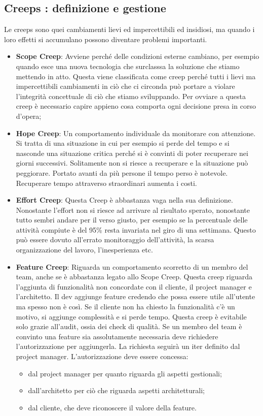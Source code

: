 \subsection{Creeps : definizione e gestione}
Le creeps sono quei cambiamenti lievi ed impercettibili ed insidiosi, ma quando i loro effetti si accumulano possono diventare problemi importanti.
\begin{itemize}
	\item \textbf{Scope Creep}: Avviene perché delle condizioni esterne cambiano, per esempio quando esce una nuova tecnologia che surclasssa la soluzione che stiamo mettendo in atto. Questa viene classificata come creep perché tutti i lievi ma impercettibili cambiamenti in ciò che ci circonda può portare a violare l'integrità concettuale di ciò che stiamo sviluppando. Per ovviare a questa creep è necessario capire appieno cosa comporta ogni decisione presa in corso d'opera;
	\item \textbf{Hope Creep}: Un comportamento individuale da monitorare con attenzione. Si tratta di una situazione in cui per esempio si perde del tempo e si nasconde una situazione critica perché si è convinti di poter recuperare nei giorni successivi. Solitamente non si riesce a recuperare e la situazione può peggiorare. Portato avanti da più persone il tempo perso è notevole. Recuperare tempo attraverso straordinari aumenta i costi.
	\item \textbf{Effort Creep}: Questa Creep è abbastanza vaga nella sua definizione. Nonostante l'effort non si riesce ad arrivare al risultato sperato, nonostante tutto sembri andare per il verso giusto, per esempio se la percentuale delle attività compiute è del 95\% resta invariata nel giro di una settimana. Questo può essere dovuto all'errato monitoraggio dell'attività, la scarsa organizzazione del lavoro, l'inesperienza etc.
	\item \textbf{Feature Creep}: Riguarda un comportamento scorretto di un membro del team, anche se è abbastanza legato allo Scope Creep. Questa creep riguarda l'aggiunta di funzionalità non concordate con il cliente, il project manager e l'architetto. Il dev aggiunge feature credendo che possa essere utile all'utente ma spesso non è così. Se il cliente non ha chiesto la funzionalità c'è un motivo, si aggiunge complessità e si perde tempo. Questa creep è evitabile solo grazie all'audit, ossia dei check di qualità.\newline
	Se un membro del team è convinto una feature sia assolutamente necessaria deve richiedere l'autorizzazione per aggiungerla. La richiesta seguirà un iter definito dal project manager. L'autorizzazione deve essere concessa:
	\begin{itemize}
		\item dal project manager per quanto riguarda gli aspetti gestionali;
		\item dall'architetto per ciò che riguarda aspetti architetturali;
		\item dal cliente, che deve riconoscere il valore della feature.
	\end{itemize}
\end{itemize}
